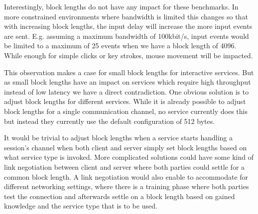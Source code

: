 Interestingly, block lengths do not have any impact for these benchmarks.
In more constrained environments where bandwidth is limited this changes so that with increasing block lengths, the input delay will increase the more input events are sent.
E.g. assuming a maximum bandwidth of 100kbit/s, input events would be limited to a maximum of 25 events when we have a block length of 4096.
While enough for simple clicks or key strokes, mouse movement will be impacted.

This observation makes a case for small block lengths for interactive services.
But as small block lengths have an impact on services which require high throughput instead of low latency we have a direct contradiction.
One obvious solution is to adjust block lengths for different services.
While it is already possible to adjust block lengths for a single communication channel, no service currently does this but instead they currently use the default configuration of 512 bytes.

It would be trivial to adjust block lengths when a service starts handling a session's channel when both client and server simply set block lengths based on what service type is invoked.
More complicated solutions could have some kind of link negotiation between client and server where both parties could settle for a common block length.
A link negotiation would also enable to accommodate for different networking settings, where there is a training phase where both parties test the connection and afterwards settle on a block length based on gained knowledge and the service type that is to be used.


